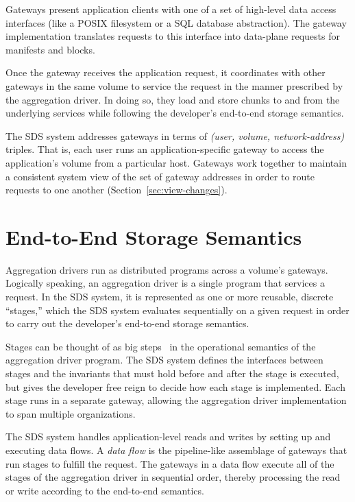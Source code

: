 Gateways present application clients with one of a set of high-level data access
interfaces (like a POSIX filesystem or a SQL database abstraction).
The gateway implementation translates requests to this interface
into data-plane requests for manifests and blocks.

Once the gateway receives the application request, it coordinates with other
gateways in the same volume to service the request in the manner prescribed by
the aggregation driver.  In doing so, they load and store chunks to and from the
underlying services while following the developer's end-to-end storage
semantics.

The SDS system addresses gateways in terms of \textit{(user, volume,
network-address)} triples.  That is, each user runs an application-specific gateway to access the
application's volume from a particular host.  Gateways work together to maintain
a consistent system view of the set of gateway addresses in order to route
requests to one another (Section~\ref{sec:view-changes}).

\section{End-to-End Storage Semantics}
\label{sec:aggregation-driver-model}

Aggregation drivers run as distributed programs across a volume's gateways.
Logically speaking, an aggregation driver is a single program that services a
request.  In the SDS system, it is represented as
one or more reusable, discrete ``stages,'' which the SDS
system evaluates sequentially on a given request in order to carry out the
developer's end-to-end storage semantics.

Stages can be thought of as big steps~\cite{big-step-semantics} in the operational semantics of the
aggregation driver program.  The SDS system defines the interfaces between stages
and the invariants that must hold before and after the stage is executed,
but gives the developer free reign to decide how each stage is implemented.
Each stage runs in a separate gateway, allowing the aggregation driver
implementation to span multiple organizations.

The SDS system handles application-level reads and writes by setting up and
executing data flows.  A \emph{data flow} is the pipeline-like assemblage of gateways
that run stages to fulfill the request.  The gateways in a data flow execute all
of the stages of the aggregation driver in sequential order, thereby processing the
read or write according to the end-to-end semantics.

